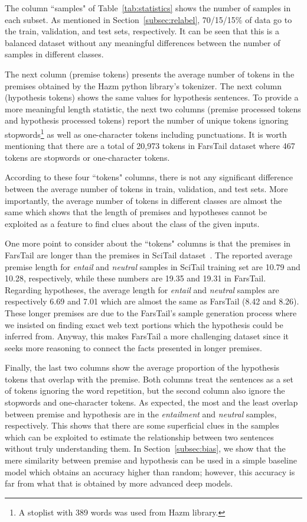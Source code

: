 \documentclass[preprint,12pt]{elsarticle}
\begin{document}
The column ``samples" of Table~\ref{tab:statistics} shows the number of samples in each subset. As mentioned in Section~\ref{subsec:relabel}, 70/15/15\% of data go to the train, validation, and test sets, respectively. It can be seen that this is a balanced dataset without any meaningful differences between the number of samples in different classes. 

The next column (premise tokens) presents the average number of tokens in the premises obtained by the Hazm python library's tokenizer. The next column (hypothesis tokens) shows the same values for hypothesis sentences. To provide a more meaningful length statistic, the next two columns (premise processed tokens and hypothesis processed tokens) report the number of unique tokens ignoring stopwords\footnote{A stoplist with 389 words was used from Hazm library.} as well as one-character tokens including punctuations. It is worth mentioning that there are a total of 20,973 tokens in FarsTail dataset where 467 tokens are stopwords or one-character tokens. 

According to these four ``tokens" columns, there is not any significant difference between the average number of tokens in train, validation, and test sets. More importantly, the average number of tokens in different classes are almost the same which shows that the length of premises and hypotheses cannot be exploited as a feature to find clues about the class of the given inputs. 

One more point to consider about the ``tokens" columns is that the premises in FarsTail are longer than the premises in SciTail dataset~\citep{khot2018scitail}. The reported average premise length for \textit{entail} and \textit{neutral} samples in SciTail training set are 10.79 and 10.28, respectively, while these numbers are 19.35 and 19.31 in FarsTail. Regarding hypotheses, the average length for \textit{entail} and \textit{neutral} samples are respectively 6.69 and 7.01 which are almost the same as FarsTail (8.42 and 8.26). These longer premises are due to the FarsTail's sample generation process where we insisted on finding exact web text portions which the hypothesis could be inferred from. Anyway, this makes FarsTail a more challenging dataset since it seeks more reasoning to connect the facts presented in longer premises. 

Finally, the last two columns show the average proportion of the hypothesis tokens that overlap with the premise. Both columns treat the sentences as a set of tokens ignoring the word repetition, but the second column also ignore the stopwords and one-character tokens. As expected, the most and the least overlap between premise and hypothesis are in the \textit{entailment} and \textit{neutral} samples, respectively. This shows that there are some superficial clues in the samples which can be exploited to estimate the relationship between two sentences without truly understanding them. In Section~\ref{subsec:bias}, we show that the mere similarity between premise and hypothesis can be used in a simple baseline model which obtains an accuracy higher than random; however, this accuracy is far from what that is obtained by more advanced deep models.
\end{document}
